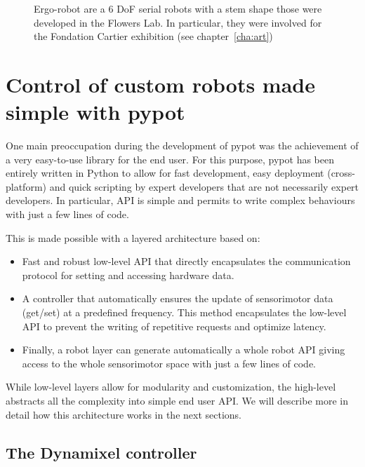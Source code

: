 \begin{figure}[tb]
\centering
    \hfil
    \caption{Ergo-robot are a 6 DoF serial robots with a stem shape those were developed in the Flowers Lab. In particular, they were involved for the Fondation Cartier exhibition (see chapter~\ref{cha:art})}
    \label{fig:ergo-robot}
\end{figure}


\section{Control of custom robots made simple with pypot} %

One main preoccupation during the development of pypot was the achievement of a very easy-to-use library for the end user. For this purpose, pypot has been entirely written in Python to allow for fast development, easy deployment (cross-platform) and quick scripting by expert developers that are not necessarily expert developers. In particular, API is simple and permits to write complex behaviours with just a few lines of code.

This is made possible with a layered architecture based on:

\begin{itemize}
    \item Fast and robust low-level API that directly encapsulates the communication protocol for setting and accessing hardware data.
    \item A controller that automatically ensures the update of sensorimotor data (get/set) at a predefined frequency. This method encapsulates the low-level API to prevent the writing of repetitive requests and optimize latency.
    \item Finally, a robot layer can generate automatically a whole robot API giving access to the whole sensorimotor space with just a few lines of code.
\end{itemize}

While low-level layers allow for modularity and customization, the high-level abstracts all the complexity into simple end user API. We will describe more in detail how this architecture works in the next sections.


\subsection{The Dynamixel controller} %
\label{sub:dynamixel-controller}

